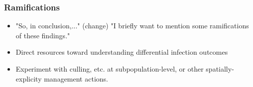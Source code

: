 \documentclass[fleqn,xcolor=table]{beamer}
\begin{document}
\begin{frame}[t]
	\frametitle{\color{darkred} Ramifications}
\vspace{.1in}
%
%
%
%
	\begin{itemize}
		\item "So, in conclusion,..." (change) "I briefly want to
			mention some ramifications of these findings."
		\item[] Direct resources toward understanding differential
			infection outcomes
		\item[] Experiment with culling, etc. at subpopulation-level,
			or other spatially-explicity management actions.
	\end{itemize}
\end{frame}
\end{document}

